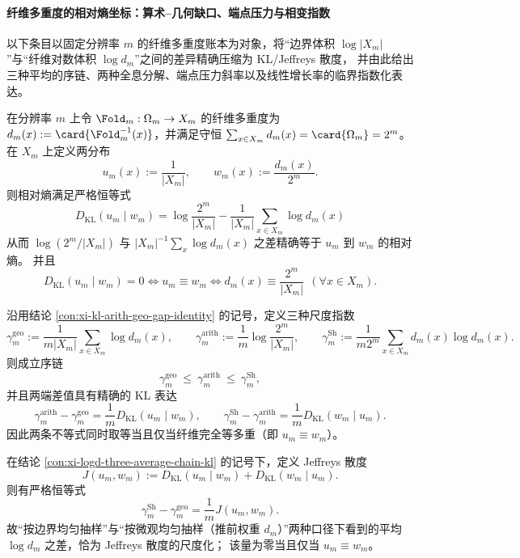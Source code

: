 
\paragraph{纤维多重度的相对熵坐标：算术--几何缺口、端点压力与相变指数}
以下条目以固定分辨率 \(m\) 的纤维多重度账本为对象，将“边界体积 \(\log|X_m|\)”与“纤维对数体积 \(\log d_m\)”之间的差异精确压缩为 KL/Jeffreys 散度，
并由此给出三种平均的序链、两种全息分解、端点压力斜率以及线性增长率的临界指数化表达。

\begin{conclusion}\label{con:xi-kl-arith-geo-gap-identity}
在分辨率 \(m\) 上令 \(\Fold_m:\Omega_m\to X_m\) 的纤维多重度为 \(d_m(x):=\card{\Fold_m^{-1}(x)}\)，并满足守恒
\(
\sum_{x\in X_m} d_m(x)=\card{\Omega_m}=2^m
\)。
在 \(X_m\) 上定义两分布
\[
u_m(x):=\frac{1}{|X_m|},
\qquad
w_m(x):=\frac{d_m(x)}{2^m}.
\]
则相对熵满足严格恒等式
\[
\boxed{\;
D_{\mathrm{KL}}(u_m\mid w_m)
=\log\frac{2^m}{|X_m|}
-\frac{1}{|X_m|}\sum_{x\in X_m}\log d_m(x)\;}
\]
从而
\(
\log(2^m/|X_m|)
\)
与
\(
|X_m|^{-1}\sum_x \log d_m(x)
\)
之差精确等于 \(u_m\) 到 \(w_m\) 的相对熵。
并且
\[
D_{\mathrm{KL}}(u_m\mid w_m)=0
\iff
u_m\equiv w_m
\iff
d_m(x)\equiv \frac{2^m}{|X_m|}\ \ (\forall x\in X_m).
\]
\end{conclusion}

\begin{conclusion}\label{con:xi-logd-three-average-chain-kl}
沿用结论 \ref{con:xi-kl-arith-geo-gap-identity} 的记号，定义三种尺度指数
\[
\gamma_m^{\mathrm{geo}}
:=\frac{1}{m|X_m|}\sum_{x\in X_m}\log d_m(x),
\qquad
\gamma_m^{\mathrm{arith}}
:=\frac{1}{m}\log\frac{2^m}{|X_m|},
\qquad
\gamma_m^{\mathrm{Sh}}
:=\frac{1}{m2^m}\sum_{x\in X_m}d_m(x)\log d_m(x).
\]
则成立序链
\[
\gamma_m^{\mathrm{geo}}\ \le\ \gamma_m^{\mathrm{arith}}\ \le\ \gamma_m^{\mathrm{Sh}},
\]
并且两端差值具有精确的 KL 表达
\[
\gamma_m^{\mathrm{arith}}-\gamma_m^{\mathrm{geo}}=\frac{1}{m}D_{\mathrm{KL}}(u_m\mid w_m),
\qquad
\gamma_m^{\mathrm{Sh}}-\gamma_m^{\mathrm{arith}}=\frac{1}{m}D_{\mathrm{KL}}(w_m\mid u_m).
\]
因此两条不等式同时取等当且仅当纤维完全等多重（即 \(u_m\equiv w_m\)）。
\end{conclusion}

\begin{conclusion}\label{con:xi-jeffreys-logd-gap-certificate}
在结论 \ref{con:xi-logd-three-average-chain-kl} 的记号下，定义 Jeffreys 散度
\[
J(u_m,w_m):=D_{\mathrm{KL}}(u_m\mid w_m)+D_{\mathrm{KL}}(w_m\mid u_m).
\]
则有严格恒等式
\[
\gamma_m^{\mathrm{Sh}}-\gamma_m^{\mathrm{geo}}=\frac{1}{m}J(u_m,w_m).
\]
故“按边界均匀抽样”与“按微观均匀抽样（推前权重 \(d_m\)）”两种口径下看到的平均 \(\log d_m\) 之差，恰为 Jeffreys 散度的尺度化；
该量为零当且仅当 \(u_m\equiv w_m\)。
\end{conclusion}

